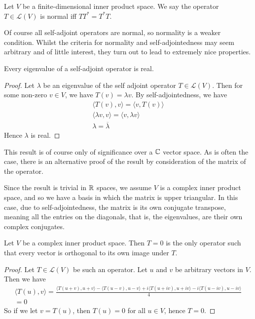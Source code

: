 \documentclass[]{article}
\begin{document}
\begin{defi} 
		Let $V$	be a finite-dimensional inner product space. We say the operator $T \in \mathcal{L}(V)$ is normal iff $TT^* = T^*T$.
\end{defi}

Of course all self-adjoint operators are normal, so normality is a weaker condition. Whilst the criteria for normality and self-adjointedness may seem arbitrary and of little interest, they turn out to lead to extremely nice properties. 

\begin{thm} \label{thm:self-adjoint-real-eigenvalues}
		Every eigenvalue of a self-adjoint operator is real.
\end{thm}

\begin{proof}
		Let $\lambda$ be an eigenvalue of the self adjoint operator $T \in \mathcal{L}(V)$. Then for some non-zero $v \in V$, we have $T(v) = \lambda v$. By self-adjointedness, we have
		\begin{align*}
				\langle T(v), v \rangle = \langle v, T(v) \rangle  \\
				\langle \lambda v, v \rangle = \langle v, \lambda v \rangle \\
		\lambda = \overline{\lambda}
		\end{align*}
		Hence $\lambda$ is real.
\end{proof}

This result is of course only of significance over a $\mathbb{C}$ vector space. As is often the case, there is an alternative proof of the result by consideration of the matrix of the operator. 

Since the result is trivial in $\mathbb{R}$ spaces, we assume $V$ is a complex inner product space, and so we have a basis in which the matrix is upper triangular. In this case, due to self-adjointedness, the matrix is its own conjugate transpose, meaning all the entries on the diagonals, that is, the eigenvalues, are their own complex conjugates.

\begin{thm}
		Let $V$ be a complex inner product space. Then $T = 0$ is the only operator such that every vector is orthogonal to its own image under $T$.
\end{thm}

\begin{proof}
		Let $T \in \mathcal{L}(V)$ be such an operator. Let $u$ and $v$ be arbitrary vectors in $V$. Then we have
		\begin{align*}
				\langle T(u), v \rangle = \frac{\langle T(u+v), u+v \rangle - \langle T(u-v), u-v \rangle + i \langle T(u+iv), u+iv \rangle - i \langle T(u-iv), u -iv \rangle }{4} \\
				= 0
		\end{align*}
		So if we let $v = T(u)$, then $T(u) = 0$ for all $u \in V$, hence $T = 0$.
\end{proof}
\end{document}

